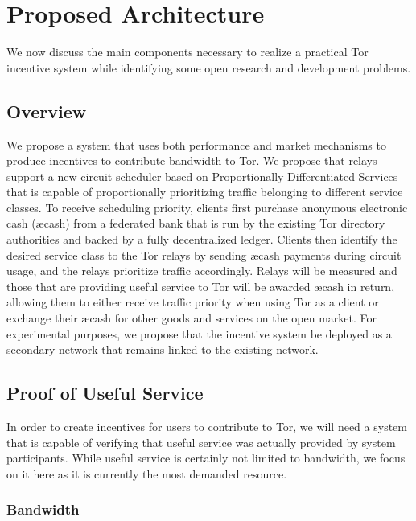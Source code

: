 \section{Proposed Architecture} \label{arch}

We now discuss the main components necessary to realize a practical Tor
incentive system while identifying some open research and development problems.

\subsection{Overview}

We propose a system that uses both performance and market mechanisms to produce
incentives to contribute bandwidth to Tor. We propose that relays support a new
circuit scheduler based on Proportionally Differentiated
Services~\cite{dovrolis1999case, dovrolis2002proportional} that is capable of
proportionally prioritizing traffic belonging to different service classes. To
receive scheduling priority, clients first purchase anonymous electronic cash
(\ae{cash}) from a federated bank that is run by the existing Tor directory
authorities and backed by a fully decentralized ledger. Clients then identify
the desired service class to the Tor relays by sending \ae{cash} payments during
circuit usage, and the relays prioritize traffic accordingly. Relays will be
measured and those that are providing useful service to Tor will be awarded
\ae{cash} in return, allowing them to either receive traffic priority when using
Tor as a client or exchange their \ae{cash} for other goods and services on the
open market. For experimental purposes, we propose that the incentive system be
deployed as a secondary network that remains linked to the existing network.

\subsection{Proof of Useful Service}

In order to create incentives for users to contribute to Tor, we will need a
system that is capable of verifying that useful service was actually provided by
system participants. While useful service is certainly not limited to bandwidth,
we focus on it here as it is currently the most demanded resource.

\subsubsection{Bandwidth}

